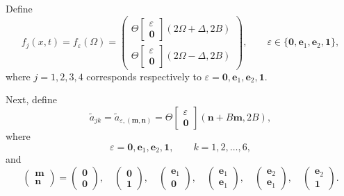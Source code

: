 \documentclass{amsart}
\numberwithin{equation}{hw}
\begin{document}
Define
\begin{equation}
f_j(x,t)
=
f_{\varepsilon}(\Omega)
=
\begin{pmatrix}
\Theta\!\begin{bmatrix}
\varepsilon\\
\bm{0}
\end{bmatrix}
(2\Omega+\Delta,2B)
\\[10pt]
\Theta\!\begin{bmatrix}
\varepsilon\\
\bm{0}
\end{bmatrix}
(2\Omega-\Delta,2B)
\end{pmatrix},
\qquad
\varepsilon
\in
\{
\bm{0},
\bm{e}_1,
\bm{e}_2,
\bm{1}
\},
\label{eq:f-epsilon}
\end{equation}
where \(j=1,2,3,4\) corresponds respectively to \(\varepsilon
=
\bm{0},
\bm{e}_1,
\bm{e}_2,
\bm{1}\).

Next, define
\begin{equation}
\widetilde{a}_{jk}
=
\widetilde{a}_{\varepsilon,(\bm{m},\bm{n})}
=
\Theta\!\begin{bmatrix}
\varepsilon\\
\bm{0}
\end{bmatrix}
(\bm{n}+B\bm{m},2B),
\label{eq:a-tilde}
\end{equation}
where
\[
\varepsilon
=
\bm{0},
\bm{e}_1,
\bm{e}_2,
\bm{1},
\qquad
k=1,2,\ldots,6,
\]
and
\begin{equation}
\begin{pmatrix}
\bm{m}\\
\bm{n}
\end{pmatrix}
=
\begin{pmatrix}
\bm{0}\\
\bm{0}
\end{pmatrix},
\quad
\begin{pmatrix}
\bm{0}\\
\bm{1}
\end{pmatrix},
\quad
\begin{pmatrix}
\bm{e}_1\\
\bm{0}
\end{pmatrix},
\quad
\begin{pmatrix}
\bm{e}_1\\
\bm{e}_1
\end{pmatrix},
\quad
\begin{pmatrix}
\bm{e}_2\\
\bm{e}_1
\end{pmatrix},
\quad
\begin{pmatrix}
\bm{e}_2\\
\bm{1}
\end{pmatrix}.
\label{eq:MN-values}
\end{equation}
\end{document}
